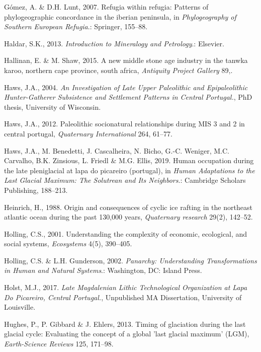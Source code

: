 \documentclass[12pt,twoside]{reedthesis}
\begin{document}
\leavevmode\hypertarget{ref-gomez2007}{}%
Gómez, A. \& D.H. Lunt, 2007. Refugia within refugia: Patterns of phylogeographic concordance in the iberian peninsula, in \emph{Phylogeography of Southern European Refugia}.: Springer, 155--88.

\leavevmode\hypertarget{ref-haldar2013}{}%
Haldar, S.K., 2013. \emph{Introduction to Mineralogy and Petrology}.: Elsevier.

\leavevmode\hypertarget{ref-hallinan2015}{}%
Hallinan, E. \& M. Shaw, 2015. A new middle stone age industry in the tanwka karoo, northern cape province, south africa, \emph{Antiquity Project Gallery} 89,.

\leavevmode\hypertarget{ref-haws2004}{}%
Haws, J.A., 2004. \emph{\textup{An Investigation of Late Upper Paleolithic and Epipaleolithic Hunter-Gatherer Subsistence and Settlement Patterns in Central Portugal.}}, PhD thesis, University of Wisconsin.

\leavevmode\hypertarget{ref-haws2012}{}%
Haws, J.A., 2012. Paleolithic socionatural relationships during MIS 3 and 2 in central portugal, \emph{Quaternary International} 264, 61--77.

\leavevmode\hypertarget{ref-hawsetal2019}{}%
Haws, J.A., M. Benedetti, J. Cascalheira, N. Bicho, G.-C. Weniger, M.C. Carvalho, B.K. Zinsious, L. Friedl \& M.G. Ellis, 2019. Human occupation during the late pleniglacial at lapa do picareiro (portugal), in \emph{Human Adaptations to the Last Glacial Maximum: The Solutrean and Its Neighbors}.: Cambridge Scholars Publishing, 188--213.

\leavevmode\hypertarget{ref-heinrich1988}{}%
Heinrich, H., 1988. Origin and consequences of cyclic ice rafting in the northeast atlantic ocean during the past 130,000 years, \emph{Quaternary research} 29(2), 142--52.

\leavevmode\hypertarget{ref-holling2001}{}%
Holling, C.S., 2001. Understanding the complexity of economic, ecological, and social systems, \emph{Ecosystems} 4(5), 390--405.

\leavevmode\hypertarget{ref-holling2002}{}%
Holling, C.S. \& L.H. Gunderson, 2002. \emph{Panarchy: Understanding Transformations in Human and Natural Systems}.: Washington, DC: Island Press.

\leavevmode\hypertarget{ref-holst2017}{}%
Holst, M.J., 2017. \emph{\textup{Late Magdalenian Lithic Technological Organization at Lapa Do Picareiro, Central Portugal.}}, Unpublished MA Dissertation, University of Louisville.

\leavevmode\hypertarget{ref-hughes2013}{}%
Hughes, P., P. Gibbard \& J. Ehlers, 2013. Timing of glaciation during the last glacial cycle: Evaluating the concept of a global 'last glacial maximum' (LGM), \emph{Earth-Science Reviews} 125, 171--98.
\end{document}
